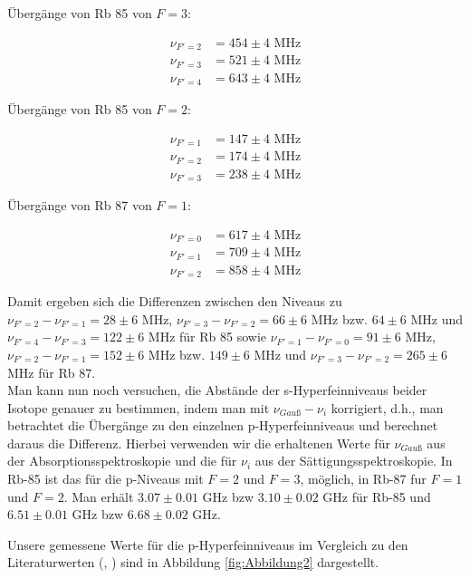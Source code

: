 \documentclass[a4paper,parskip]{scrartcl}
\begin{document}
Übergänge von Rb 85 von $F=3$:

\begin{align*}
\nu_{F'=2} &= 454 \pm 4 \text{ MHz} \\
\nu_{F'=3} &= 521 \pm 4 \text{ MHz} \\
\nu_{F'=4} &= 643 \pm 4 \text{ MHz}  
\end{align*}

Übergänge von Rb 85 von $F=2$:

\begin{align*}
\nu_{F'=1} &= 147 \pm 4 \text{ MHz} \\
\nu_{F'=2} &= 174 \pm 4 \text{ MHz} \\
\nu_{F'=3} &= 238 \pm 4 \text{ MHz}  
\end{align*}

Übergänge von Rb 87 von $F=1$:

\begin{align*}
\nu_{F'=0} &= 617 \pm 4 \text{ MHz} \\
\nu_{F'=1} &= 709 \pm 4 \text{ MHz} \\
\nu_{F'=2} &= 858 \pm 4 \text{ MHz}  
\end{align*}

Damit ergeben sich die Differenzen zwischen den Niveaus zu $\nu_{F'=2} - \nu_{F'=1} = 28 \pm 6$ MHz, $\nu_{F'=3} - \nu_{F'=2} = 66 \pm 6$ MHz bzw. $64 \pm 6$ MHz und $\nu_{F'=4} - \nu_{F'=3} = 122 \pm 6$ MHz für Rb 85 sowie $\nu_{F'=1} - \nu_{F'=0} = 91 \pm 6$ MHz, $\nu_{F'=2} - \nu_{F'=1} = 152 \pm 6$ MHz bzw. $149 \pm 6$ MHz und  $\nu_{F'=3} - \nu_{F'=2} = 265 \pm 6$ MHz für Rb 87.\\

Man  kann nun noch versuchen, die Abstände der s-Hyperfeinniveaus beider Isotope genauer zu bestimmen, indem man mit $\nu_{Gauß} - \nu_i$ korrigiert, d.h., man betrachtet die Übergänge zu den einzelnen p-Hyperfeinniveaus und berechnet daraus die Differenz. Hierbei verwenden wir die erhaltenen Werte für $\nu_{Gauß}$ aus der Absorptionsspektroskopie und die für $\nu_i$ aus der Sättigungsspektroskopie. In Rb-85 ist das für die p-Niveaus mit $F=2$ und $F=3$, möglich, in Rb-87 fur $F=1$ und $F=2$. Man erhält
$3.07 \pm 0.01$ GHz bzw $3.10 \pm 0.02$ GHz für Rb-85 und $6.51 \pm 0.01$ GHz bzw $6.68 \pm 0.02$ GHz.

Unsere gemessene Werte für die p-Hyperfeinniveaus im Vergleich zu den Literaturwerten (\cite{Ref:1}, \cite{Ref:2}) sind in Abbildung \ref{fig:Abbildung2} dargestellt.
\end{document}
